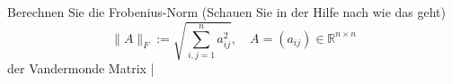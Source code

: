 \begin{aufg}[0]
Berechnen Sie die Frobenius-Norm (Schauen Sie in der Hilfe nach wie das geht)
\[ \|A \|_F := \sqrt{ \sum_{i,j=1}^n a_{ij}^2 }, \quad A=(a_{ij}) \in
\mathbb{R}^{n \times n}  \]
der Vandermonde Matrix 
|  
\end{aufg}
